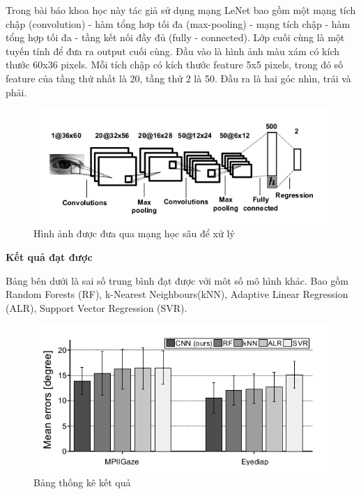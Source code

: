 Trong bài báo khoa học này tác giả sử dụng mạng LeNet bao gồm  một mạng tích chập (convolution) - hàm tổng hơp tối đa (max-pooling) - mạng tích chập - hàm tổng hợp tối đa - tầng kết nối đầy đủ (fully - connected). Lớp cuối cùng là một tuyến tính để đưa ra output cuối cùng. Đầu vào là hình ảnh màu xám có kích thước 60x36 pixels. Mỗi tích chập có kích thước feature 5x5 pixels, trong đó số feature của tầng thứ nhất là 20, tầng thứ 2 là 50. Đầu ra là hai góc nhìn, trái và phải.
\begin{center}
    \begin{figure}[h!]
    \begin{center}
     \includegraphics[scale=0.5]{img/conv.png}
    \end{center}
    \caption{Hình ảnh được đưa qua mạng học sâu để xử lý}
    \label{refhinh19}
    \end{figure}
\end{center}
\newpage
\textbf{Kết quả đạt được}

Bảng bên dưới là  sai số trung bình đạt được với môt số mô hình khác. Bao gồm Random Forests (RF), k-Nearest Neighbours(kNN), Adaptive Linear Regression (ALR), Support Vector Regression (SVR).
\begin{center}
    \begin{figure}[h!]
    \begin{center}
     \includegraphics[scale=0.5]{img/2dataset.png}
    \end{center}
    \caption{Bảng thống kê kết quả}
    \label{refhinh20}
    \end{figure}
\end{center}
